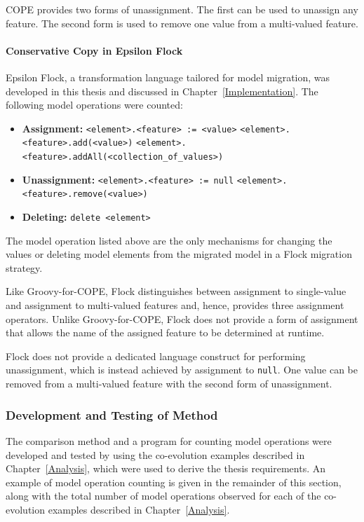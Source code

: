 COPE provides two forms of unassignment. The first can be used to unassign any feature. The second form is used to remove one value from a multi-valued feature.


\paragraph{Conservative Copy in Epsilon Flock}
Epsilon Flock, a transformation language tailored for model migration, was developed in this thesis and discussed in Chapter~\ref{Implementation}. The following model operations were counted:

\begin{itemize}
	\item \textbf{Assignment:}
	\subitem \texttt{<element>.<feature> := <value>} 
	\subitem \texttt{<element>.<feature>.add(<value>)}
	\subitem \texttt{<element>.<feature>.addAll(<collection\_of\_values>)}
	
	\item \textbf{Unassignment:}
	\subitem \texttt{<element>.<feature> := null}
	\subitem \texttt{<element>.<feature>.remove(<value>)}
	
	\item \textbf{Deleting:}
	\subitem \texttt{delete <element>}
\end{itemize}

The model operation listed above are the only mechanisms for changing the values or deleting model elements from the migrated model in a Flock migration strategy.

Like Groovy-for-COPE, Flock distinguishes between assignment to single-value and assignment to multi-valued features and, hence, provides three assignment operators. Unlike Groovy-for-COPE, Flock does not provide a form of assignment that allows the name of the assigned feature to be determined at runtime.

Flock does not provide a dedicated language construct for performing unassignment, which is instead achieved by assignment to \texttt{null}. One value can be removed from a multi-valued feature with the second form of unassignment.


\subsubsection{Development and Testing of Method}
\label{subsubsec:quantitive_method_development}
The comparison method and a program for counting model operations were developed and tested by using the co-evolution examples described in Chapter~\ref{Analysis}, which were used to derive the thesis requirements. An example of model operation counting is given in the remainder of this section, along with the total number of model operations observed for each of the co-evolution examples described in Chapter~\ref{Analysis}.


